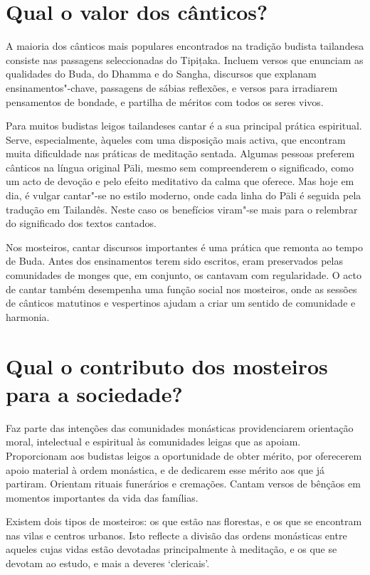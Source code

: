 \section{Qual o valor dos cânticos?}

A maioria dos cânticos mais populares encontrados na tradição budista
tailandesa consiste nas passagens seleccionadas do Tipițaka. Incluem
versos que enunciam as qualidades do Buda, do Dhamma e do Sangha,
discursos que explanam ensinamentos"-chave, passagens de sábias
reflexões, e versos para irradiarem pensamentos de bondade, e partilha
de méritos com todos os seres vivos.

Para muitos budistas leigos tailandeses cantar é a sua principal prática
espiritual. Serve, especialmente, àqueles com uma disposição mais
activa, que encontram muita dificuldade nas práticas de meditação
sentada. Algumas pessoas preferem cânticos na língua original Pāli,
mesmo sem compreenderem o significado, como um acto de devoção e pelo
efeito meditativo da calma que oferece. Mas hoje em dia, é vulgar
cantar"-se no estilo moderno, onde cada linha do Pāli é seguida pela
tradução em Tailandês. Neste caso os benefícios viram"-se mais para o
relembrar do significado dos textos cantados.

Nos mosteiros, cantar discursos importantes é uma prática que remonta ao
tempo de Buda. Antes dos ensinamentos terem sido escritos, eram
preservados pelas comunidades de monges que, em conjunto, os cantavam
com regularidade. O acto de cantar também desempenha uma função social
nos mosteiros, onde as sessões de cânticos matutinos e vespertinos
ajudam a criar um sentido de comunidade e harmonia.

\section{Qual o contributo dos mosteiros para a sociedade?}

Faz parte das intenções das comunidades monásticas providenciarem
orientação moral, intelectual e espiritual às comunidades leigas que as
apoiam. Proporcionam aos budistas leigos a oportunidade de obter mérito,
por oferecerem apoio material à ordem monástica, e de dedicarem esse
mérito aos que já partiram. Orientam rituais funerários e
cremações. Cantam versos de bênçãos em momentos importantes da vida das
famílias.

Existem dois tipos de mosteiros: os que estão nas florestas, e os que se
encontram nas vilas e centros urbanos. Isto reflecte a divisão das
ordens monásticas entre aqueles cujas vidas estão devotadas
principalmente à meditação, e os que se devotam ao estudo, e mais a
deveres `clericais'.

